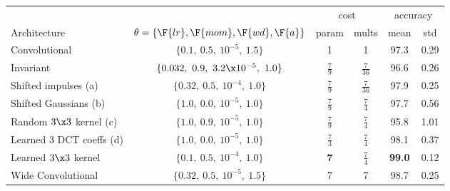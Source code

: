 \begin{table}[hbt]
  \renewcommand{\arraystretch}{1.4}
  \centering
  \label{tab:ch5:mnist_new_results}
  \begin{tabular}{@{}l c c c c c@{}}
    \toprule
    & & \multicolumn{2}{c}{cost} & \multicolumn{2}{c}{accuracy} \\\cline{3-4}\cline{5-6}
    Architecture & $\theta = \{\F{lr}, \F{mom}, \F{wd}, \F{a}\}$ & param & mults & mean & std  \\\midrule
    Convolutional & $\{0.1,\ 0.5,\ 10^{-5},\ 1.5 \}$ & 1 & 1 & 97.3 & 0.29 \\
    Invariant & $\{0.032,\ 0.9,\ 3.2\x 10^{-5},\ 1.0 \}$ & $\frac{7}{9}$ & $\frac{7}{36}$ & 96.6 & 0.26 \\\midrule
    Shifted impulses (a) & $\{0.32,\ 0.5,\ 10^{-4},\ 1.0 \}$ & $\frac{7}{9}$ & $\frac{7}{36}$ & 97.9 & 0.25 \\
    Shifted Gaussians (b) & $\{1.0,\ 0.0,\ 10^{-5},\ 1.0 \}$ & $\frac{7}{9}$ & $\frac{7}{4}$ & 97.7 & 0.56\\
    Random $3\x3$ kernel (c) & $\{1.0,\ 0.9,\  10^{-5},\ 1.0 \}$ & $\frac{7}{9}$ & $\frac{7}{4}$ & 95.8 & 1.01\\
    Learned 3 DCT coeffs (d) & $\{1.0,\ 0.0,\ 10^{-5},\ 1.0 \}$ & $\frac{7}{3}$ & $\frac{7}{4}$ & 98.1 & 0.37\\\midrule
    Learned $3\x3$ kernel & $\{0.1,\ 0.5,\  10^{-4},\ 1.0 \}$ & \textbf{7} & $\frac{7}{4}$ & \textbf{99.0} & 0.12 \\\midrule
    Wide Convolutional & $\{0.32,\ 0.5,\ 10^{-5},\ 1.5 \}$ & 7 & 7 & 98.7 & 0.25  \\
    \bottomrule
  \end{tabular}
\end{table}
